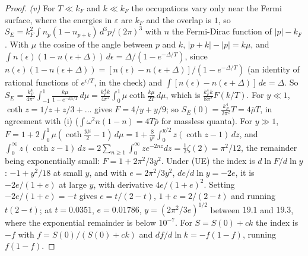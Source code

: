 \begin{proof}
\emph{(v)} For $T \ll k_{F}$ and $k \ll k_{F}$ the occupations vary only near the Fermi surface, where the energies in $\varepsilon$ are $k_{F}$ and the overlap is $1$, so $S_{E} = k_{F}^{2}\int n_{p}(1 - n_{p + k})\,d^{3}p/(2\pi)^{3}$ with $n$ the Fermi-Dirac function of $|p| - k_{F}$. With $\mu$ the cosine of the angle between $p$ and $k$, $|p + k| - |p| = k\mu$, and $\int n(\epsilon)(1 - n(\epsilon + \Delta))\,d\epsilon = \Delta/(1 - e^{-\Delta/T})$, since $n(\epsilon)(1 - n(\epsilon + \Delta)) = [n(\epsilon) - n(\epsilon + \Delta)]/(1 - e^{-\Delta/T})$ (an identity of rational functions of $e^{\epsilon/T}$, in the check) and $\int[n(\epsilon) - n(\epsilon + \Delta)]\,d\epsilon = \Delta$. So $S_{E} = \tfrac{k_{F}^{4}}{4\pi^{2}}\int_{-1}^{1}\tfrac{k\mu}{1 - e^{-k\mu/T}}\,d\mu = \tfrac{k_{F}^{4}k}{4\pi^{2}}\int_{0}^{1}\mu\operatorname{coth}\tfrac{k\mu}{2T}\,d\mu$, which is $\tfrac{k_{F}^{4}k}{8\pi^{2}}F(k/T)$. For $y \ll 1$, $\operatorname{coth} z = 1/z + z/3 + \dots$ gives $F = 4/y + y/9$; so $S_{E}(0) = \tfrac{k_{F}^{4}}{2\pi^{2}}T = 4\bar\rho T$, in agreement with (i) ($\int\omega^{2}n(1 - n) = 4T\bar\rho$ for massless quanta). For $y \gg 1$, $F = 1 + 2\int_{0}^{1}\mu(\operatorname{coth}\tfrac{y\mu}{2} - 1)\,d\mu = 1 + \tfrac{8}{y^{2}}\int_{0}^{y/2}z(\operatorname{coth} z - 1)\,dz$, and $\int_{0}^{\infty}z(\operatorname{coth} z - 1)\,dz = 2\sum_{n \ge 1}\int_{0}^{\infty}ze^{-2nz}dz = \tfrac12\zeta(2) = \pi^{2}/12$, the remainder being exponentially small: $F = 1 + 2\pi^{2}/3y^{2}$. Under (UE) the index is $d\ln F/d\ln y$: $-1 + y^{2}/18$ at small $y$, and with $e = 2\pi^{2}/3y^{2}$, $de/d\ln y = -2e$, it is $-2e/(1 + e)$ at large $y$, with derivative $4e/(1 + e)^{2}$. Setting $-2e/(1 + e) = -t$ gives $e = t/(2 - t)$, $1 + e = 2/(2 - t)$ and running $t(2 - t)$; at $t = 0.0351$, $e = 0.01786$, $y = (2\pi^{2}/3e)^{1/2}$ between $19.1$ and $19.3$, where the exponential remainder is below $10^{-7}$. For $S = S(0) + ck$ the index is $-f$ with $f = S(0)/(S(0) + ck)$ and $df/d\ln k = -f(1 - f)$, running $f(1 - f)$.


\end{proof}
